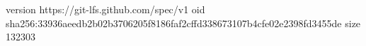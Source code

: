 version https://git-lfs.github.com/spec/v1
oid sha256:33936aeedb2b02b3706205f8186faf2cffd338673107b4cfe02e2398fd3455de
size 132303
